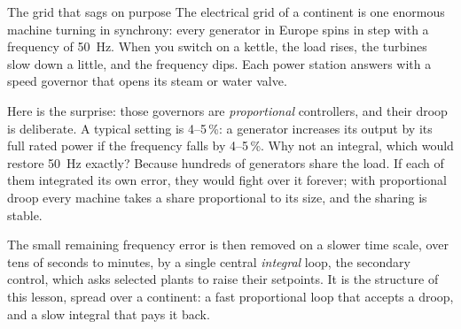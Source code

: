 \begin{curiosity}{The grid that sags on purpose}
The electrical grid of a continent is one enormous machine turning in synchrony: every generator in Europe spins in step with a frequency of \SI{50}{Hz}. When you switch on a kettle, the load rises, the turbines slow down a little, and the frequency dips. Each power station answers with a speed governor that opens its steam or water valve.

Here is the surprise: those governors are \emph{proportional} controllers, and their droop is deliberate. A typical setting is 4–5\,\%: a generator increases its output by its full rated power if the frequency falls by 4–5\,\%. Why not an integral, which would restore \SI{50}{Hz} exactly? Because hundreds of generators share the load. If each of them integrated its own error, they would fight over it forever; with proportional droop every machine takes a share proportional to its size, and the sharing is stable.

The small remaining frequency error is then removed on a slower time scale, over tens of seconds to minutes, by a single central \emph{integral} loop, the secondary control, which asks selected plants to raise their setpoints. It is the structure of this lesson, spread over a continent: a fast proportional loop that accepts a droop, and a slow integral that pays it back.
\end{curiosity}

